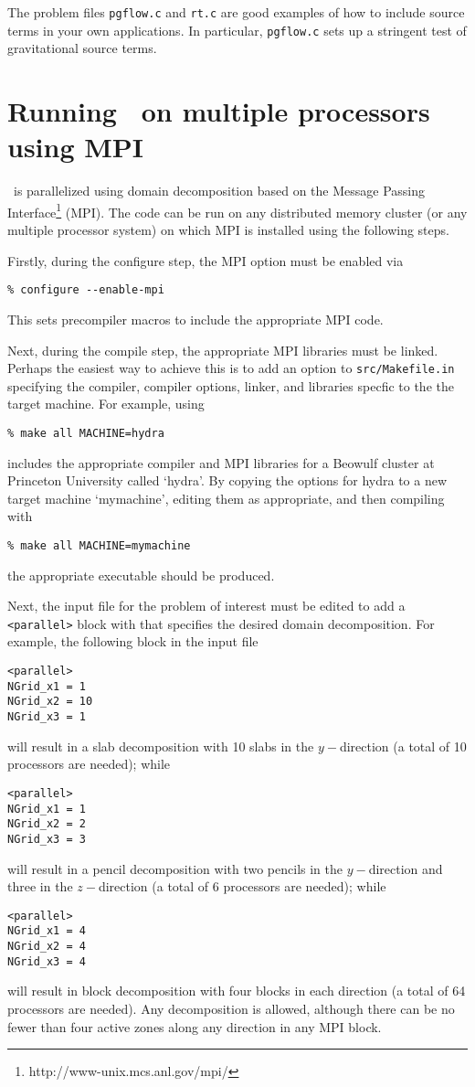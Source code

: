 The problem files {\tt pgflow.c} and {\tt rt.c} are good examples
of how to include source terms in your own applications.  In particular,
{\tt pgflow.c} sets up a stringent test of gravitational source terms.

\section{Running \ath\ on multiple processors using MPI}

\ath\ is parallelized using domain decomposition based on the
Message Passing Interface\footnote{http://www-unix.mcs.anl.gov/mpi/} (MPI).
The code can be run on any distributed memory cluster (or any multiple
processor system) on which MPI is installed using the following steps.

Firstly, during the configure step, the MPI option must be enabled via
\begin{verbatim}
% configure --enable-mpi
\end{verbatim}
This sets precompiler macros to include the appropriate MPI code.

Next, during the compile step, the appropriate MPI libraries must be
linked.  Perhaps the easiest way to achieve this is to add an option
to {\tt src/Makefile.in} specifying the compiler, compiler options, linker,
and libraries specfic to the the target machine.  For example, using
\begin{verbatim}
% make all MACHINE=hydra
\end{verbatim}
includes the appropriate compiler and MPI libraries for a Beowulf cluster
at Princeton University called `hydra'.  By copying the options for hydra
to a new target machine `mymachine', editing them as appropriate, and
then compiling with
\begin{verbatim}
% make all MACHINE=mymachine
\end{verbatim}
the appropriate executable should be produced.

Next, the input file for the problem of interest must be edited to add
a {\tt <parallel>} block with that specifies the desired domain decomposition.
For example, the following block in the input file
\begin{verbatim}
<parallel>
NGrid_x1 = 1
NGrid_x2 = 10
NGrid_x3 = 1
\end{verbatim}
will result in a slab decomposition with 10 slabs in the $y-$direction
(a total of 10 processors are needed); while
\begin{verbatim}
<parallel>
NGrid_x1 = 1
NGrid_x2 = 2
NGrid_x3 = 3
\end{verbatim}
will result in a pencil decomposition with two pencils in the $y-$direction and
three in the $z-$direction (a total of 6 processors are needed); while
\begin{verbatim}
<parallel>
NGrid_x1 = 4
NGrid_x2 = 4
NGrid_x3 = 4
\end{verbatim}
will result in block decomposition with four blocks in each direction
(a total of 64 processors are needed).  Any decomposition is allowed,
although there can be no fewer than four active zones along any direction
in any MPI block.

